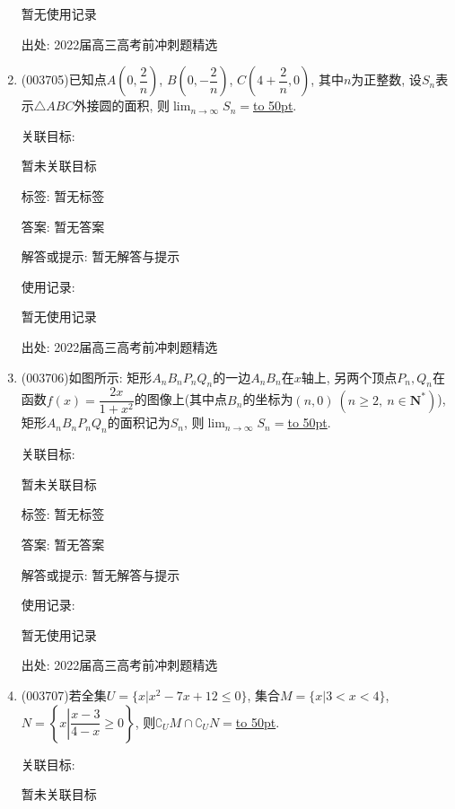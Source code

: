 \documentclass[10pt,a4paper]{article}
\newcommand{\blank}[1]{\underline{\hbox to #1pt{}}}
\begin{document}
\begin{enumerate}[1.]
暂无使用记录


出处: 2022届高三高考前冲刺题精选
\item { (003705)}已知点$A(0,\dfrac2n)$, $B(0,-\dfrac2n)$, $C(4+\dfrac2n,0)$, 其中$n$为正整数, 设$S_n$表示$\triangle ABC$外接圆的面积, 则$\displaystyle\lim_{n\to\infty}{S_n}=$\blank{50}.


关联目标:

暂未关联目标



标签: 暂无标签

答案: 暂无答案

解答或提示: 暂无解答与提示

使用记录:

暂无使用记录


出处: 2022届高三高考前冲刺题精选
\item { (003706)}如图所示: 矩形$A_nB_nP_nQ_n$的一边$A_nB_n$在$x$轴上, 另两个顶点$P_n,Q_n$在函数$f(x)=\dfrac{2x}{1+x^2}$的图像上(其中点$B_n$的坐标为$(n,0) \ (n\ge 2,\ n\in \mathbf{N}^*)$), 矩形$A_nB_nP_nQ_n$的面积记为$S_n$, 则$\displaystyle\lim_{n\to\infty}{S_n}=$\blank{50}.
\begin{center}
\end{center}


关联目标:

暂未关联目标



标签: 暂无标签

答案: 暂无答案

解答或提示: 暂无解答与提示

使用记录:

暂无使用记录


出处: 2022届高三高考前冲刺题精选
\item { (003707)}若全集$U=\{x|x^2-7x+12\le 0\}$, 集合$M=\{x|3<x<4\}$, $N=\left\{x\left|\dfrac{x-3}{4-x}\ge 0\right.\right\}$, 则$\complement_U M\cap \complement_U N=$\blank{50}.


关联目标:

暂未关联目标




\end{enumerate}
\end{document}
